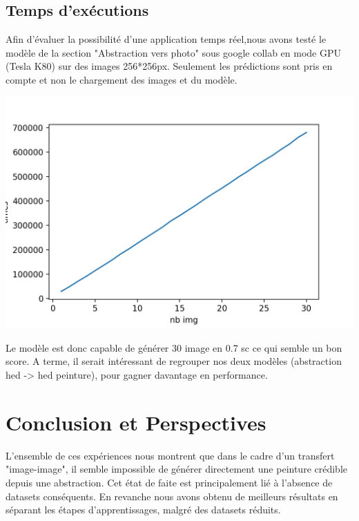 \documentclass[a4paper, 12pt]{report}
\begin{document}
\pagebreak


\section{Temps d'exécutions}

Afin d'évaluer la possibilité d'une application temps réel,nous avons testé le modèle de la section "Abstraction vers photo" sous google collab en mode GPU (Tesla K80) sur des images 256*256px. Seulement les prédictions sont pris en compte et non le chargement des images et du modèle.

\begin{center}
  \centering
    \includegraphics[width=0.9\linewidth]{images/time-gpu.png}
\end{center}

Le modèle est donc capable de générer 30 image en 0.7 sc ce qui semble un bon score.  A terme, il serait intéressant de regrouper nos deux modèles (abstraction hed -> hed peinture), pour gagner davantage en performance.


\chapter{Conclusion et Perspectives\label{chap-conclusion}}

L'ensemble de ces expériences nous montrent que dans le cadre d'un transfert "image-image", il semble impossible de générer directement une peinture crédible depuis une abstraction. Cet état de faite est principalement lié à l’absence de datasets conséquents. En revanche nous avons obtenu de meilleurs résultats en séparant les étapes d'apprentissages, malgré des datasets réduits. 
\end{document}

